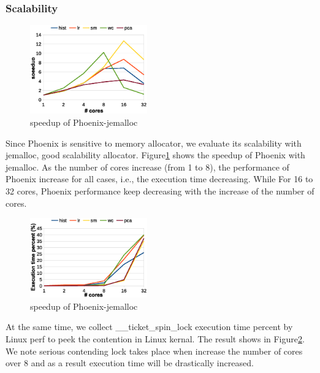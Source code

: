 \subsubsection{Scalability}
\begin{figure}[!h!t]  
	\centering
	\includegraphics[width=0.45\textwidth]{eps/phoenix_speedup_jemalloc.eps}
	\caption{speedup of Phoenix-jemalloc}
	\label{fig:phoenix:speedup:jemalloc}
\end{figure}
Since Phoenix is sensitive to memory allocator, we evaluate its scalability with jemalloc, good scalability allocator.
Figure\ref{fig:phoenix:speedup:jemalloc} shows the speedup of Phoenix with jemalloc.
As the number of cores increase (from 1 to 8), the performance of Phoenix increase for all cases, i.e., the execution time decreasing. 
While For 16 to 32 cores, Phoenix performance keep decreasing with the increase of the number of cores.
\begin{figure}[!h!t]  
	\centering
	\includegraphics[width=0.45\textwidth]{eps/phoenix_spinlock_jemalloc.eps}
	\caption{speedup of Phoenix-jemalloc}
	\label{fig:phoenix:spinlock:jemalloc}
\end{figure}
At the same time, we collect \_\_ticket\_spin\_lock execution time percent by Linux perf to peek the contention in Linux kernal.
The result shows in Figure\ref{fig:phoenix:spinlock:jemalloc}.
We note serious contending lock takes place when increase the number of cores over 8 and as a result execution time will be drastically increased.

